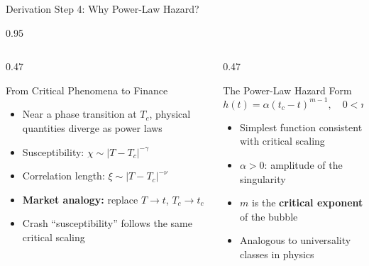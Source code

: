 \documentclass[9pt, aspectratio=169, t]{beamer}
\begin{document}
\begin{frame}{Derivation Step 4: Why Power-Law Hazard?}
    \begin{cminipage}{0.95\textwidth}
    {\footnotesize
    \begin{columns}[T]
        \begin{column}{0.47\textwidth}
            \begin{block}{From Critical Phenomena to Finance}
                \begin{itemize}\setlength{\itemsep}{0pt}
                    \item Near a phase transition at $T_c$, physical quantities diverge as power laws
                    \item Susceptibility: $\chi \sim |T - T_c|^{-\gamma}$
                    \item Correlation length: $\xi \sim |T - T_c|^{-\nu}$
                    \item \textbf{Market analogy:} replace $T \to t$, $T_c \to t_c$
                    \item Crash ``susceptibility'' follows the same critical scaling
                \end{itemize}
            \end{block}
        \end{column}
        \begin{column}{0.47\textwidth}
            \begin{alertblock}{The Power-Law Hazard Form}
                \vspace{-2mm}
                $$\boxed{h(t) = \alpha(t_c - t)^{m-1}, \quad 0 < m < 1}$$
                \vspace{-3mm}
                \begin{itemize}\setlength{\itemsep}{0pt}
                    \item Simplest function consistent with critical scaling
                    \item $\alpha > 0$: amplitude of the singularity
                    \item $m$ is the \textbf{critical exponent} of the bubble
                    \item Analogous to universality classes in physics
                \end{itemize}
            \end{alertblock}
        \end{column}
    \end{columns}
    \vspace{-2mm}
}
\end{cminipage}
\end{frame}
\end{document}

